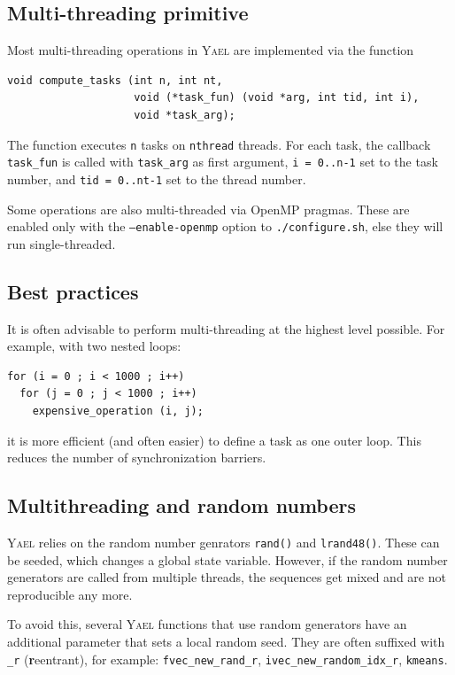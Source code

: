 \documentclass[a4paper,11pt,notitlepage,final,twoside]{report}
\newcommand{\yael}{\textsc{Yael}\xspace}
\newcommand{\tc}[1]{\texttt{#1}}
\begin{document}
\subsection{Multi-threading primitive}

Most multi-threading operations in \yael are implemented via the function 
\begin{verbatim}
void compute_tasks (int n, int nt,
                    void (*task_fun) (void *arg, int tid, int i),
                    void *task_arg);
\end{verbatim}

The function executes \tc{n} tasks on \tc{nthread} threads. For each task, the callback \tc{task\_fun} is called with \tc{task\_arg} as first argument, \tc{i = 0..n-1} set to the task number, and \tc{tid = 0..nt-1} set to the thread number. 

Some operations are also multi-threaded via OpenMP pragmas. These are enabled only with the \tc{--enable-openmp} option to  \tc{./configure.sh}, else they will run single-threaded.


\subsection{Best practices}

It is often advisable to perform multi-threading at the highest level possible. For example, with two nested loops: 

\begin{verbatim}
for (i = 0 ; i < 1000 ; i++)    
  for (j = 0 ; j < 1000 ; i++) 
    expensive_operation (i, j);
\end{verbatim}

it is more efficient (and often easier) to define a task as one outer loop. This reduces the number of synchronization barriers. 


\subsection{Multithreading and random numbers}

\yael relies on the random number genrators \tc{rand()} and \tc{lrand48()}. These can be seeded, which changes a  global state variable. However, if the random number generators are called from multiple threads, the sequences get mixed and are not reproducible any more. 

To avoid this, several \yael functions that use random generators have an additional parameter that sets a local random seed. They are often suffixed with \tc{\_r} (\textbf{r}eentrant), for example: \tc{fvec\_new\_rand\_r}, \tc{ivec\_new\_random\_idx\_r}, \tc{kmeans}.
\end{document}
